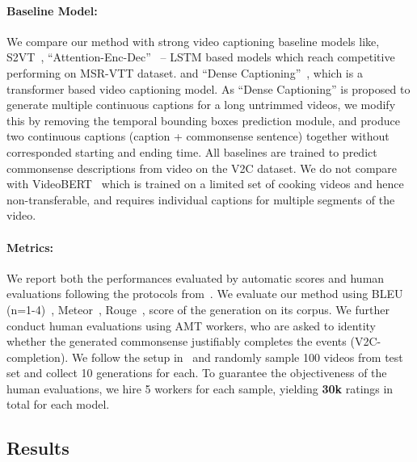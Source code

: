     \paragraph{Baseline Model:} 
    We compare our method with strong video captioning baseline models like, S2VT~\cite{venugopalan2015sequence}, ``Attention-Enc-Dec''~\cite{gao2017video} -- LSTM based models which reach competitive performing on MSR-VTT dataset.
    and ``Dense Captioning''~\cite{zhou2018end}, which is a transformer based video captioning model. As ``Dense Captioning'' is proposed to generate multiple continuous captions for a long untrimmed videos, we modify this by removing the temporal bounding boxes prediction module, and produce two continuous captions (caption + commonsense sentence) together without corresponded starting and ending time.
    All baselines are trained to predict commonsense descriptions from video on the V2C dataset.
    We do not compare with VideoBERT~\cite{sun2019videobert} which is trained on a limited set of cooking videos and hence non-transferable, and requires individual captions for multiple segments of the video.


    
    \paragraph{Metrics:}
    We report both the performances evaluated by automatic scores and human evaluations following the protocols from~\cite{bosselut2019comet,sap2018atomic}.
    We evaluate our method using BLEU (n=1-4)~\cite{papineni2002bleu}, Meteor~\cite{banerjee2005meteor}, Rouge~\cite{lin2004rouge}, score of the generation on its corpus.
    We further conduct human evaluations using AMT workers, who are asked to identity whether the generated commonsense justifiably completes the events (V2C-completion). 
    We follow the setup in~\cite{sap2018atomic} and randomly sample 100 videos from test set and collect 10 generations for each.
    To guarantee the objectiveness of the human evaluations, we hire 5 workers for each sample, yielding \textbf{30k} ratings in total for each model.


    \subsection{Results}
    
